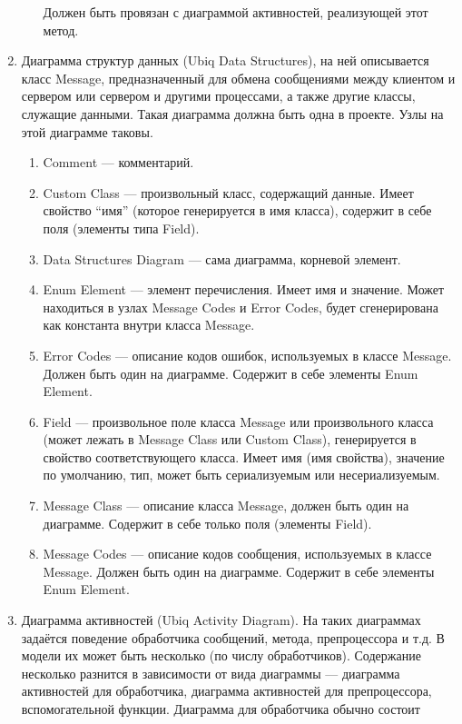 \begin{enumerate}
\begin{enumerate}
				Должен быть провязан с диаграммой активностей, реализующей этот метод.
		\end{enumerate}
	\item Диаграмма структур данных (Ubiq Data Structures), на ней описывается класс 
		Message, предназначенный для обмена сообщениями между клиентом и сервером или 
		сервером и другими процессами, а также другие классы, служащие данными. Такая 
		диаграмма должна быть одна в проекте. Узлы на этой диаграмме таковы.
		\begin{enumerate}
			\item Comment --- комментарий.
			\item Custom Class --- произвольный класс, содержащий данные. Имеет свойство 
				"`имя"' (которое генерируется в имя класса), содержит в себе поля (элементы 
				типа Field).
			\item Data Structures Diagram --- сама диаграмма, корневой элемент.
			\item Enum Element --- элемент перечисления. Имеет имя и значение. Может находиться 
				в узлах Message Codes и Error Codes, будет сгенерирована как константа внутри 
				класса Message.
			\item Error Codes --- описание кодов ошибок, используемых в классе Message. 
				Должен быть один на диаграмме. Содержит в себе элементы Enum Element.
			\item Field --- произвольное поле класса Message или произвольного класса (может 
				лежать в Message Class или Custom Class), генерируется в свойство соответствующего 
				класса. Имеет имя (имя свойства), значение по умолчанию, тип, может быть сериализуемым 
				или несериализуемым.
			\item Message Class --- описание класса Message, должен быть один на диаграмме. 
				Содержит в себе только поля (элементы Field).
			\item Message Codes --- описание кодов сообщения, используемых в классе Message. 
				Должен быть один на диаграмме. Содержит в себе элементы Enum Element.
		\end{enumerate}
	\item Диаграмма активностей (Ubiq Activity Diagram). На таких диаграммах задаётся 
		поведение обработчика сообщений, метода, препроцессора и т.д. В модели их может 
		быть несколько (по числу обработчиков). Содержание несколько разнится в зависимости 
		от вида диаграммы --- диаграмма активностей для обработчика, диаграмма активностей 
		для препроцессора, вспомогательной функции. Диаграмма для обработчика обычно состоит 

\end{enumerate}
